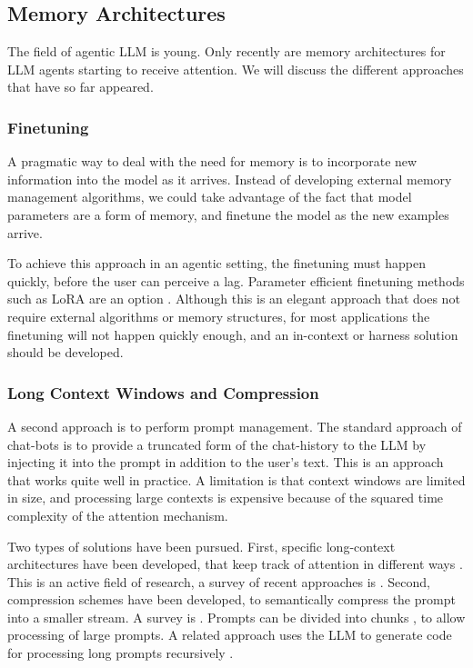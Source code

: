 \subsection{Memory Architectures}
The field of agentic LLM is young. Only recently are memory architectures for LLM agents  starting to receive attention. We will discuss the different approaches that have so far appeared. 

\subsubsection{Finetuning}
A pragmatic way to deal with the need for memory is to incorporate new information into the model as it arrives. Instead of developing external memory management algorithms, we could take advantage of the fact that model parameters are a form of memory, and finetune the model as the new examples arrive. 

To achieve this approach in an agentic setting, the finetuning must happen quickly, before the user can perceive a lag. Parameter efficient finetuning methods such as LoRA are an option \citep{yang2024low}.  Although this is an elegant approach that does not require external algorithms or memory structures, for most applications the finetuning will not happen quickly enough, and an in-context or harness solution should be developed.

\subsubsection{Long Context Windows and Compression}
A second approach is to perform prompt management. The standard approach of chat-bots is to provide a truncated form of the chat-history to the LLM by injecting it into the prompt in addition to the user's text. This is an approach that works quite well in practice. A limitation is that context windows are limited in size, and processing large contexts is expensive  because of the squared time complexity of the attention mechanism. 

Two types of solutions have been pursued. First,  specific long-context architectures have been developed, that keep track of attention in different ways  \citep{smith2022simplified}. This is an active field of research, a survey of recent approaches is  \citet{liu2025comprehensive}.
Second, compression schemes have been developed, to semantically compress the prompt into a smaller stream. A survey is \citet{li2025prompt}.
Prompts can be divided into chunks \citep{sheng2025dynamic}, to allow processing of large prompts. A related approach uses the LLM to generate code for processing long prompts recursively \citep{zhang2025recursive}. 

